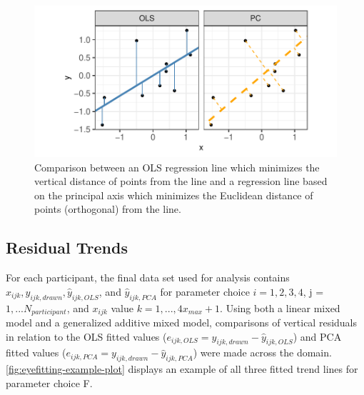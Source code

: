 \documentclass[12pt]{article}
\begin{document}
\begin{figure}[tbp]

{\centering \includegraphics[width=0.8\linewidth,]{Eye-Fitting-Straight-Lines-in-the-Modern-Era_files/figure-latex/ols-vs-pca-example-1} 

}

\caption{ Comparison between an OLS regression line which minimizes the vertical distance of points from the line and a regression line based on the principal axis which minimizes the Euclidean distance of points (orthogonal) from the line.}\label{fig:ols-vs-pca-example}
\end{figure}

\hypertarget{residual-trends}{%
\subsection{Residual Trends}\label{residual-trends}}

For each participant, the final data set used for analysis contains
\(x_{ijk}, y_{ijk,drawn}, \hat y_{ijk,OLS}\), and \(\hat y_{ijk,PCA}\)
for parameter choice \(i = 1,2,3,4\), j = \(1,...N_{participant}\), and
\(x_{ijk}\) value \(k = 1, ...,4 x_{max} + 1\). Using both a linear
mixed model and a generalized additive mixed model, comparisons of
vertical residuals in relation to the OLS fitted values
(\(e_{ijk,OLS} = y_{ijk,drawn} - \hat y_{ijk,OLS}\)) and PCA fitted
values (\(e_{ijk,PCA} = y_{ijk,drawn} - \hat y_{ijk,PCA}\)) were made
across the domain. \cref{fig:eyefitting-example-plot} displays an
example of all three fitted trend lines for parameter choice F.
\end{document}
